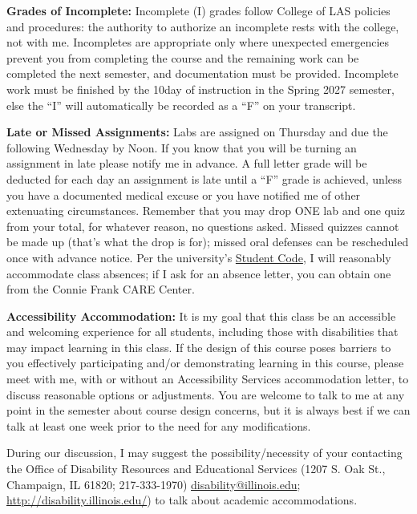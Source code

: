 {\bf \headerfont \color{RoyalBlue} Grades of Incomplete:}
Incomplete (I) grades follow College of LAS policies and procedures: the
authority to authorize an incomplete rests with the college, not with me.
Incompletes are appropriate only where unexpected emergencies prevent you from
completing the course and the remaining work can be completed the next
semester, and documentation must be provided. Incomplete work must
be finished by the 10\nth day of instruction in the Spring 2027 semester, else
the ``{\color{BurntOrange}I}'' will automatically be recorded as a
``{\color{Red}F}'' on your transcript.
\medskip

{\bf \headerfont \color{RoyalBlue} Late or Missed Assignments:}
Labs are assigned on Thursday and due the following Wednesday by Noon. If you
know that you will be turning an assignment in late please notify me in
advance. A full letter grade will be deducted for each day an assignment is
late until a ``{\color{Red}F}'' grade is achieved, unless you have a documented
medical excuse or you have notified me of other extenuating circumstances.
Remember that you may drop ONE lab and one quiz from your total, for whatever
reason, no questions asked. Missed quizzes cannot be made up (that's what the
drop is for); missed oral defenses can be rescheduled once with advance notice.
Per the university's \href{https://studentcode.illinois.edu/}{Student Code}, I
will reasonably accommodate class absences; if I ask for an absence letter,
you can obtain one from the Connie Frank CARE Center.
\medskip

{\bf \headerfont \color{RoyalBlue} Accessibility Accommodation:}
It is my goal that this class be an accessible and welcoming experience for all
students, including those with disabilities that may impact learning in this
class. If the design of this course poses barriers to you effectively
participating and/or demonstrating learning in this course, please meet with
me, with or without an Accessibility Services accommodation letter, to discuss
reasonable options or adjustments. You are welcome to talk to me at any point
in the semester about course design concerns, but it is always best if we can
talk at least one week prior to the need for any modifications.

During our discussion, I may suggest the possibility/necessity of your
contacting the Office of Disability Resources and Educational Services (1207 S.
Oak St., Champaign, IL 61820; 217-333-1970)
\href{mailto:disability@illinois.edu}{disability@illinois.edu};
\url{http://disability.illinois.edu/}) to talk about academic accommodations.
\medskip

